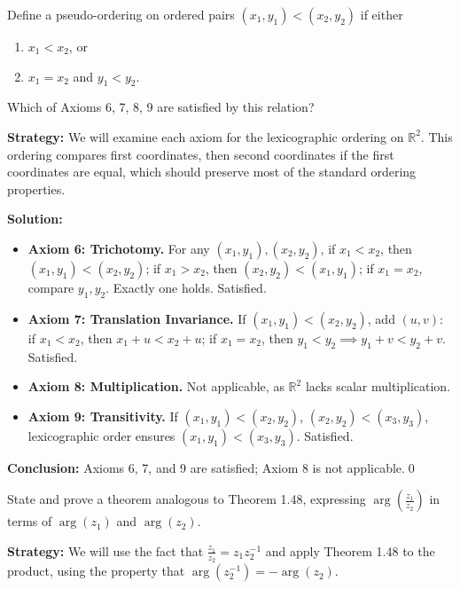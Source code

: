 \begin{problembox}
Define a pseudo-ordering on ordered pairs \((x_1, y_1) < (x_2, y_2)\) if either
\begin{enumerate}[label=(\roman*)]
\item \(x_1 < x_2\), or
\item \(x_1 = x_2\) and \(y_1 < y_2\).
\end{enumerate}
Which of Axioms 6, 7, 8, 9 are satisfied by this relation?
\end{problembox}

\noindent\textbf{Strategy:} We will examine each axiom for the lexicographic ordering on $\mathbb{R}^2$. This ordering compares first coordinates, then second coordinates if the first coordinates are equal, which should preserve most of the standard ordering properties.

\bigskip\noindent\textbf{Solution:}
\begin{itemize}
\item \textbf{Axiom 6: Trichotomy.} For any \( (x_1, y_1), (x_2, y_2) \), if \( x_1 < x_2 \), then \( (x_1, y_1) < (x_2, y_2) \); if \( x_1 > x_2 \), then \( (x_2, y_2) < (x_1, y_1) \); if \( x_1 = x_2 \), compare \( y_1, y_2 \). Exactly one holds. Satisfied.
\item \textbf{Axiom 7: Translation Invariance.} If \( (x_1, y_1) < (x_2, y_2) \), add \( (u, v) \): if \( x_1 < x_2 \), then \( x_1 + u < x_2 + u \); if \( x_1 = x_2 \), then \( y_1 < y_2 \implies y_1 + v < y_2 + v \). Satisfied.
\item \textbf{Axiom 8: Multiplication.} Not applicable, as \( \mathbb{R}^2 \) lacks scalar multiplication.
\item \textbf{Axiom 9: Transitivity.} If \( (x_1, y_1) < (x_2, y_2) \), \( (x_2, y_2) < (x_3, y_3) \), lexicographic order ensures \( (x_1, y_1) < (x_3, y_3) \). Satisfied.
\end{itemize}
\textbf{Conclusion:} Axioms 6, 7, and 9 are satisfied; Axiom 8 is not applicable.\qed


\begin{problembox}
State and prove a theorem analogous to Theorem 1.48, expressing \( \arg\left( \frac{z_1}{z_2} \right) \) in terms of \( \arg(z_1) \) and \( \arg(z_2) \).
\end{problembox}

\noindent\textbf{Strategy:} We will use the fact that $\frac{z_1}{z_2} = z_1 z_2^{-1}$ and apply Theorem 1.48 to the product, using the property that $\arg(z_2^{-1}) = -\arg(z_2)$.

